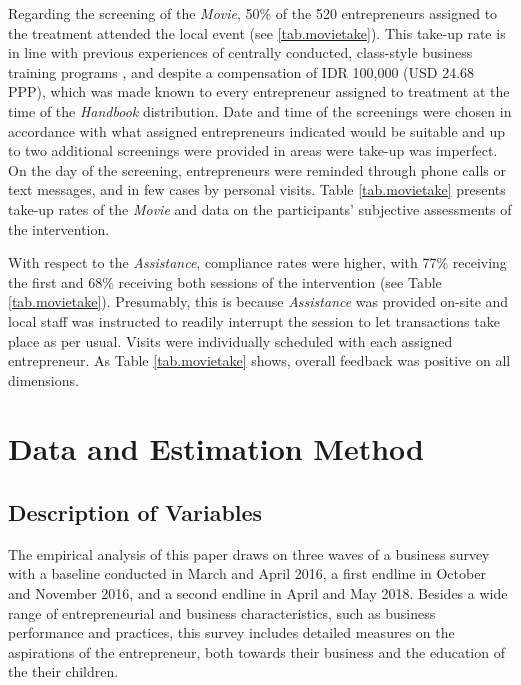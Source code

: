 \documentclass[11.5pt]{article}
\begin{document}
Regarding the screening of the \emph{Movie}, 50\% of the 520 entrepreneurs assigned to the treatment attended the local event (see \ref{tab.movietake}). This take-up rate is in line with previous experiences of centrally conducted, class-style business training programs \citep[see, e.g.,][]{Drexler2014, Gine2014, Bruhn2017, Bruhn2013, Calderon2013, Premand2016}, and despite a compensation of IDR 100,000 (USD 24.68 PPP), which was made known to every entrepreneur assigned to treatment at the time of the \emph{Handbook} distribution. Date and time of the screenings were chosen in accordance with what assigned entrepreneurs indicated would be suitable and up to two additional screenings were provided in areas were take-up was imperfect. On the day of the screening, entrepreneurs were reminded through phone calls or text messages, and in few cases by personal visits. Table \ref{tab.movietake} presents take-up rates of the \emph{Movie} and data on the participants' subjective assessments of the intervention.%

With respect to the \emph{Assistance}, compliance rates were higher, with 77\% receiving the first and 68\% receiving both sessions of the intervention (see Table \ref{tab.movietake}). Presumably, this is because \emph{Assistance} was provided on-site and local staff was instructed to readily interrupt the session to let transactions take place as per usual. Visits were individually scheduled with each assigned entrepreneur. As Table \ref{tab.movietake} shows, overall feedback was positive on all dimensions.

\section{Data and Estimation Method}\label{sec.data}

\subsection{Description of Variables}

The empirical analysis of this paper draws on three waves of a business survey with a baseline conducted in March and April 2016, a first endline in October and November 2016, and a second endline in April and May 2018. Besides a wide range of entrepreneurial and business characteristics, such as business performance and practices, this survey includes detailed measures on the aspirations of the entrepreneur, both towards their business and the education of the their children. \\ %
\end{document}
